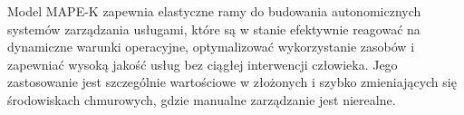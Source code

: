 Model MAPE-K zapewnia elastyczne ramy do budowania autonomicznych systemów zarządzania usługami, które są w stanie efektywnie reagować na dynamiczne warunki operacyjne, optymalizować wykorzystanie zasobów i zapewniać wysoką jakość usług bez ciągłej interwencji człowieka. Jego zastosowanie jest szczególnie wartościowe w złożonych i szybko zmieniających się środowiskach chmurowych, gdzie manualne zarządzanie jest nierealne.





% 
% 








